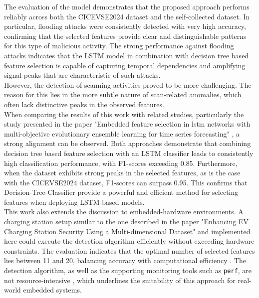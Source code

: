 The evaluation of the model demonstrates that the proposed approach performs reliably across both the CICEVSE2024 dataset and the self-collected dataset. In particular, flooding attacks were consistently detected with very high accuracy, confirming that the selected features provide clear and distinguishable patterns for this type of malicious activity. The strong performance against flooding attacks indicates that the LSTM model in combination with decision tree based feature selection is capable of capturing temporal dependencies and amplifying signal peaks that are characteristic of such attacks.\\
However, the detection of scanning activities proved to be more challenging. The reason for this lies in the more subtle nature of scan-related anomalies, which often lack distinctive peaks in the observed features.\\

When comparing the results of this work with related studies, particularly the study presented in the paper "Embedded feature selection in lstm networks with multi-objective evolutionary ensemble learning for time series forecasting" \cite{lstm_feature_selection}, a strong alignment can be observed. Both approaches demonstrate that combining decision tree based feature selection with an LSTM classifier leads to consistently high classification performance, with F1-scores exceeding 0.85. Furthermore, when the dataset exhibits strong peaks in the selected features, as is the case with the CICEVSE2024 dataset, F1-scores can surpass 0.95. This confirms that Decision-Tree-Classifier provide a powerful and efficient method for selecting features when deploying LSTM-based models.\\
This work also extends the discussion to embedded-hardware environments. A charging station setup similar to the one described in the paper "Enhancing EV Charging Station Security Using a Multi-dimensional Dataset" \cite{EV_Security} and implemented here could execute the detection algorithm efficiently without exceeding hardware constraints. The evaluation indicates that the optimal number of selected features lies between 11 and 20, balancing accuracy with computational efficiency \cite{EV_Security}. The detection algorithm, as well as the supporting monitoring tools such as \texttt{perf}, are not resource-intensive \cite{perf_ressource_usage}, which underlines the suitability of this approach for real-world embedded systems.\\

